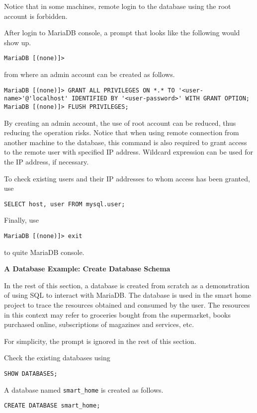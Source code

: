 Notice that in some machines, remote login to the database using the root account is forbidden.

After login to MariaDB console, a prompt that looks like the following would show up.
\begin{lstlisting}
MariaDB [(none)]>
\end{lstlisting}
from where an admin account can be created as follows.
\begin{lstlisting}
MariaDB [(none)]> GRANT ALL PRIVILEGES ON *.* TO '<user-name>'@'localhost' IDENTIFIED BY '<user-password>' WITH GRANT OPTION;
MariaDB [(none)]> FLUSH PRIVILEGES;
\end{lstlisting}
By creating an admin account, the use of root account can be reduced, thus reducing the operation risks. Notice that when using remote connection from another machine to the database, this command is also required to grant access to the remote user with specified IP address. Wildcard expression can be used for the IP address, if necessary.

To check existing users and their IP addresses to whom access has been granted, use
\begin{lstlisting}
SELECT host, user FROM mysql.user;
\end{lstlisting}

Finally, use
\begin{lstlisting}
MariaDB [(none)]> exit
\end{lstlisting}
to quite MariaDB console.

\vspace{0.1in}
\noindent \textbf{A Database Example: Create Database Schema}
\vspace{0.1in}

In the rest of this section, a database is created from scratch as a demonstration of using SQL to interact with MariaDB. The database is used in the smart home project to trace the resources obtained and consumed by the user. The resources in this context may refer to groceries bought from the supermarket, books purchased online, subscriptions of magazines and services, etc.

For simplicity, the prompt is ignored in the rest of this section.

Check the existing databases using
\begin{lstlisting}
SHOW DATABASES;
\end{lstlisting}

A database named \verb|smart_home| is created as follows.
\begin{lstlisting}
CREATE DATABASE smart_home;
\end{lstlisting}

